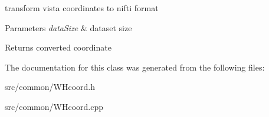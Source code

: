 transform vista coordinates to nifti format 
\begin{DoxyParams}{\-Parameters}
{\em data\-Size} & dataset size \\
\hline
\end{DoxyParams}
\begin{DoxyReturn}{\-Returns}
converted coordinate 
\end{DoxyReturn}


\-The documentation for this class was generated from the following files\-:\begin{DoxyCompactItemize}
\item 
src/common/\-W\-Hcoord.\-h\item 
src/common/\-W\-Hcoord.\-cpp\end{DoxyCompactItemize}
